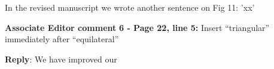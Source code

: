\documentclass[a4paper]{article}
\def\aecom{\textbf{Associate Editor comment }}
\def\reply{\textbf{Reply}}
\begin{document}
In the revised manuscript we wrote another sentence on Fig 11: 'xx'

\vspace{5mm}
\noindent \aecom \textbf{6 - Page 22, line 5:}  Insert “triangular” immediately after “equilateral”

\vspace{5mm}
\reply: We have improved our 

\vspace{1em}


\footnotesize



\end{document}
